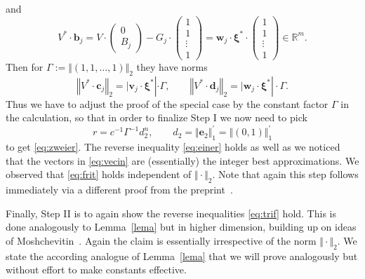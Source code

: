 \documentclass[10pt]{amsart}
\theoremstyle{definition}
\newcommand{\ee}{\boldsymbol{e}}
\newcommand{\w}{\boldsymbol{w}}
\newcommand{\vv}{\boldsymbol{v}}
\newcommand{\uxs}{\boldsymbol{\xi}^{\ast}}
\newcommand{\R}{\mathbb{R}}
\begin{document}
and
\[ V^{\ast}\cdot \boldsymbol{b}_j= V\cdot \begin{pmatrix}
0 \\ B_j
\end{pmatrix}- G_j\cdot \begin{pmatrix}
1 \\ 1 \\ \vdots \\ 1
\end{pmatrix}=\w_j\cdot \uxs\cdot \begin{pmatrix}
1 \\ 1 \\ \vdots \\ 1
\end{pmatrix}\in \R^m.
\]
Then for $\Gamma:=\Vert(1,1,\ldots,1)\Vert_2$ they have norms
\[
\left\Vert V^{\ast}\cdot \boldsymbol{c}_j\right\Vert_2= 
\vert \vv_j\cdot \uxs|\cdot \Gamma, \qquad \left\Vert V^{\ast}\cdot \boldsymbol{d}_j\right\Vert_2= 
\vert \w_j\cdot \uxs|\cdot \Gamma.
\]
Thus we have to adjust the proof of the special case by the constant 
factor $\Gamma$ in the calculation, so that
in order to finalize Step I we now need to pick
\[
r=c^{-1}\Gamma^{-1} d_2^n,\qquad d_2= \Vert \ee_2\Vert_1^{\prime}=\Vert (0,1)\Vert_1^{\prime}
\]
to get \eqref{eq:zweier}. The reverse inequality \eqref{eq:einer} holds as well as we noticed
that the vectors in \eqref{eq:vecin} are (essentially) 
the integer best approximations.
We observed that \eqref{eq:frit} holds independent of $\Vert\cdot\Vert_2$. 
Note that again
this step follows immediately  via a different proof from the preprint~\cite[Corollary~1]{AginWeiss2024}. 

\par 
 Finally, Step II is to again show the reverse inequalities \eqref{eq:trif} hold. This is done analogously to Lemma~\ref{lema} but in
higher dimension, building up on ideas of Moshchevitin~\cite[Theorem~12]{ngm}.
Again the claim is essentially irrespective of the norm $\Vert\cdot\Vert_2$. We state the according analogue of Lemma~\ref{lema} that we will prove analogously but without effort to make constants effective. 
\end{document}
